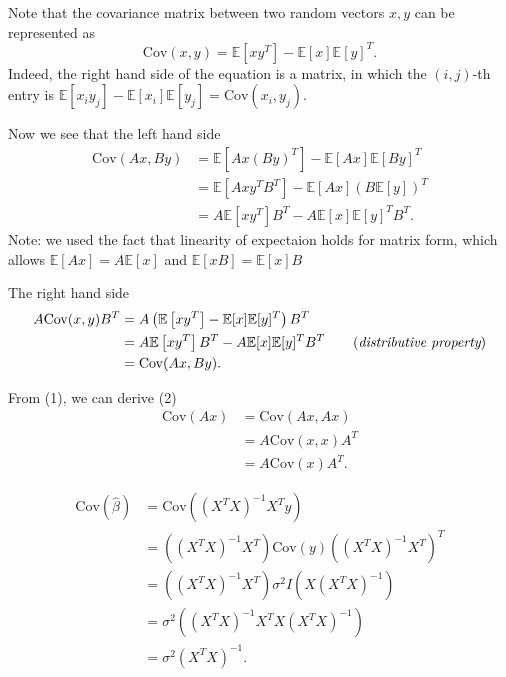 \documentclass{article}
\begin{document}
Note that the covariance matrix between two random vectors $x,y$ can be represented as 
$$\mathrm{Cov}(x,y) = \mathbb{E}\left[xy^T\right] - \mathbb{E}\left[x\right]\mathbb{E}\left[y\right]^T.$$
Indeed, the right hand side of the equation is a matrix, in which the $(i,j)$-th entry is
$\mathbb{E}[x_iy_j] - \mathbb{E}[x_i]\mathbb{E}[y_j]=\mathrm{Cov}(x_i,y_j)$.

Now we see that the left hand side
\begin{align*}
    \mathrm{Cov}(Ax, By) & = \mathbb{E}\left[Ax(By)^T\right] - \mathbb{E}[Ax]\mathbb{E}[By]^T \\
    & = \mathbb{E}\left[Axy^TB^T\right] - \mathbb{E}[Ax]\left(B\mathbb{E}[y]\right)^T \\
    & = A\mathbb{E}\left[xy^T\right]B^T - A\mathbb{E}[x]\mathbb{E}[y]^TB^T.
\end{align*}
Note: we used the fact that linearity of expectaion holds for matrix form, which allows
$\mathbb{E}[Ax] = A\mathbb{E}[x]$ and $\mathbb{E}[xB] = \mathbb{E}[x]B$

The right hand side 
\begin{align*}
    A\mathrm{Cov}(x,y)B^T & = A\left(\mathbb{E}\left[xy^T\right] - \mathbb{E}[x]\mathbb{E}[y]^T\right)B^T \\
    & = A\mathbb{E}\left[xy^T\right]B^T - A\mathbb{E}[x]\mathbb{E}[y]^TB^T \qquad (\emph{distributive property}) \\
    & = \mathrm{Cov}(Ax, By).
\end{align*}

From (1), we can derive (2)
\begin{align*}
    \mathrm{Cov}(Ax) & = \mathrm{Cov}(Ax,Ax) \\
    & = A\mathrm{Cov}(x, x)A^T \\
    & = A\mathrm{Cov}(x)A^T.
\end{align*}




\begin{align*}
    \mathrm{Cov}(\hat{\beta}) & = \mathrm{Cov}\left(\left(X^TX\right)^{-1}X^Ty\right) \\
    & = \left(\left(X^TX\right)^{-1}X^T\right)\mathrm{Cov}(y)\left(\left(X^TX\right)^{-1}X^T\right)^T \\
    & = \left(\left(X^TX\right)^{-1}X^T\right)\sigma^2I\left(X\left(X^TX\right)^{-1}\right) \\
    & = \sigma^2\left(\left(X^TX\right)^{-1}X^TX\left(X^TX\right)^{-1}\right) \\
    & = \sigma^2\left(X^TX\right)^{-1}.
\end{align*}
\end{document}
